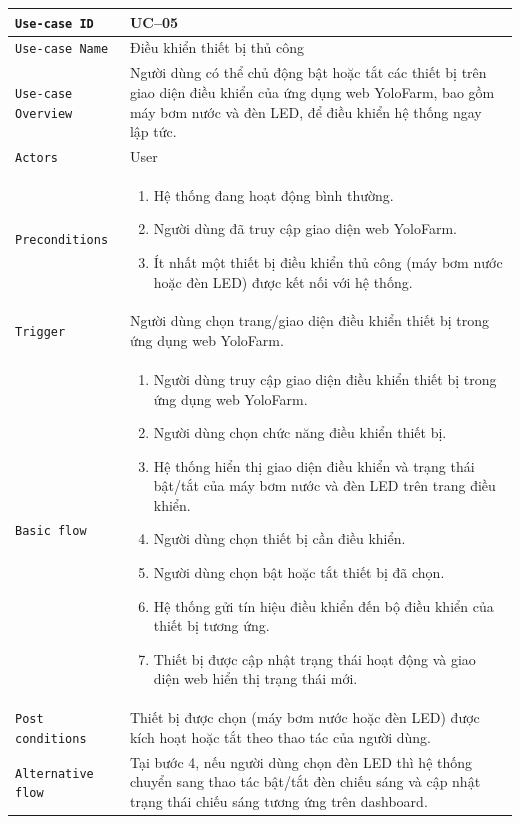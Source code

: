 \begin{longtable}{|P{4.8cm}|m{10cm}|}\hline
	\texttt{Use-case ID} & UC--05\\
	\hline
	\texttt{Use-case Name} & Điều khiển thiết bị thủ công\\
	\hline
	\texttt{Use-case Overview} & Người dùng có thể chủ động bật hoặc tắt các thiết bị trên giao diện điều khiển của ứng dụng web YoloFarm, bao gồm máy bơm nước và đèn LED, để điều khiển hệ thống ngay lập tức.
	\\
	\hline
	\texttt{Actors} & User
	\\
	\hline
	\texttt{Preconditions} &
	\begin{enumerate}[label = \arabic*.]
		\item Hệ thống đang hoạt động bình thường.
		\item Người dùng đã truy cập giao diện web YoloFarm.
		\item Ít nhất một thiết bị điều khiển thủ công (máy bơm nước hoặc đèn LED) được kết nối với hệ thống.
	\end{enumerate}
	\\
	\hline
	\texttt{Trigger} & Người dùng chọn trang/giao diện điều khiển thiết bị trong ứng dụng web YoloFarm.\\
	\hline
	\texttt{Basic flow} &
	\begin{enumerate}
		\item Người dùng truy cập giao diện điều khiển thiết bị trong ứng dụng web YoloFarm.
		\item Người dùng chọn chức năng điều khiển thiết bị.
		\item Hệ thống hiển thị giao diện điều khiển và trạng thái bật/tắt của máy bơm nước và đèn LED trên trang điều khiển.
		\item Người dùng chọn thiết bị cần điều khiển.
		\item Người dùng chọn bật hoặc tắt thiết bị đã chọn.
		\item Hệ thống gửi tín hiệu điều khiển đến bộ điều khiển của thiết bị tương ứng.
		\item Thiết bị được cập nhật trạng thái hoạt động và giao diện web hiển thị trạng thái mới.
	\end{enumerate}
	\\
	\hline
	\texttt{Post conditions} &
	Thiết bị được chọn (máy bơm nước hoặc đèn LED) được kích hoạt hoặc tắt theo thao tác của người dùng.
	\\
	\hline
	\texttt{Alternative flow} & Tại bước 4, nếu người dùng chọn đèn LED thì hệ thống chuyển sang thao tác bật/tắt đèn chiếu sáng và cập nhật trạng thái chiếu sáng tương ứng trên dashboard.\\

\end{longtable}
